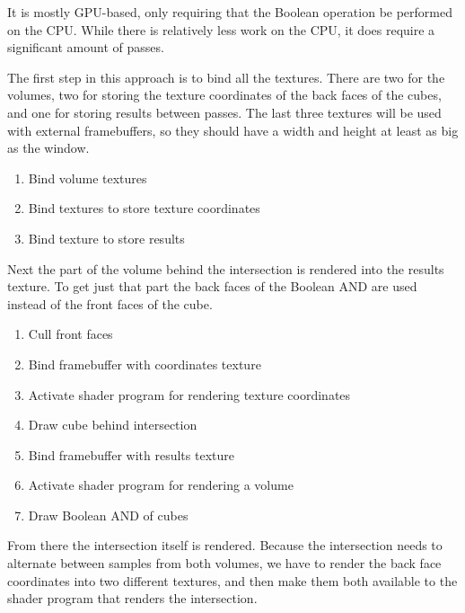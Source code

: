 \documentclass{article}
\begin{document}
It is mostly GPU-based, only requiring that the Boolean operation be performed
on the CPU.  While there is relatively less work on the CPU, it does require a
significant amount of passes.

The first step in this approach is to bind all the textures.  There are two for
the volumes, two for storing the texture coordinates of the back faces of the
cubes, and one for storing results between passes.  The last three textures will
be used with external framebuffers, so they should have a width and height at
least as big as the window.

\begin{enumerate}
  \item Bind volume textures
  \item Bind textures to store texture coordinates
  \item Bind texture to store results
\end{enumerate}

Next the part of the volume behind the intersection is rendered into the results
texture.  To get just that part the back faces of the Boolean AND are used
instead of the front faces of the cube.

\begin{enumerate}
  \item Cull front faces
  \item Bind framebuffer with coordinates texture
  \item Activate shader program for rendering texture coordinates
  \item Draw cube behind intersection
  \item Bind framebuffer with results texture
  \item Activate shader program for rendering a volume
  \item Draw Boolean AND of cubes
\end{enumerate}

From there the intersection itself is rendered.  Because the intersection needs
to alternate between samples from both volumes, we have to render the back face
coordinates into two different textures, and then make them both available to
the shader program that renders the intersection.
\end{document}
